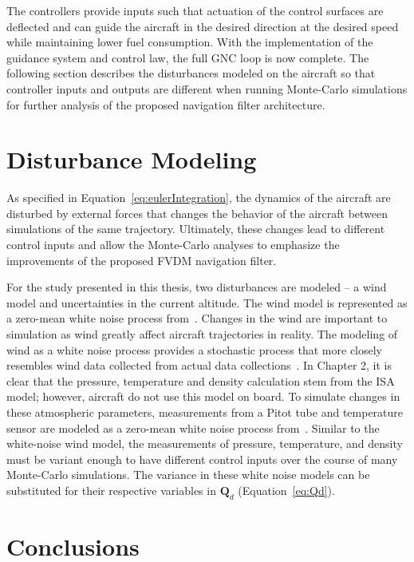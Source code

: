 The controllers provide inputs such that actuation of the control surfaces are deflected and can guide the aircraft in the desired direction at the desired speed while maintaining lower fuel consumption. With the implementation of the guidance system and control law, the full GNC loop is now complete. The following section describes the disturbances modeled on the aircraft so that controller inputs and outputs are different when running Monte-Carlo simulations for further analysis of the proposed navigation filter architecture.

\section{\textbf{Disturbance Modeling}}

As specified in Equation~\ref{eq:eulerIntegration}, the dynamics of the aircraft are disturbed by external forces that changes the behavior of the aircraft between simulations of the same trajectory. Ultimately, these changes lead to different control inputs and allow the Monte-Carlo analyses to emphasize the improvements of the proposed FVDM navigation filter.

For the study presented in this thesis, two disturbances are modeled {--} a wind model and uncertainties in the current altitude. The wind model is represented as a zero-mean white noise process from~\cite{khaghaniAutonomousVehicleDynamic2016}. Changes in the wind are important to simulation as wind greatly affect aircraft trajectories in reality. The modeling of wind as a white noise process provides a stochastic process that more closely resembles wind data collected from actual data collections~\cite{mwenegohaModelbasedTightlyCoupled2020}. In Chapter 2, it is clear that the pressure, temperature and density calculation stem from the ISA model; however, aircraft do not use this model on board. To simulate changes in these atmospheric parameters, measurements from a Pitot tube and temperature sensor are modeled as a zero-mean white noise process from~\cite{pieniazekDynamicResponsePitot2023}. Similar to the white-noise wind model, the measurements of pressure, temperature, and density must be variant enough to have different control inputs over the course of many Monte-Carlo simulations. The variance in these white noise models can be substituted for their respective variables in \(\mathbf{Q}_d\) (Equation~\ref{eq:Qd}).

\section{\textbf{Conclusions}}


